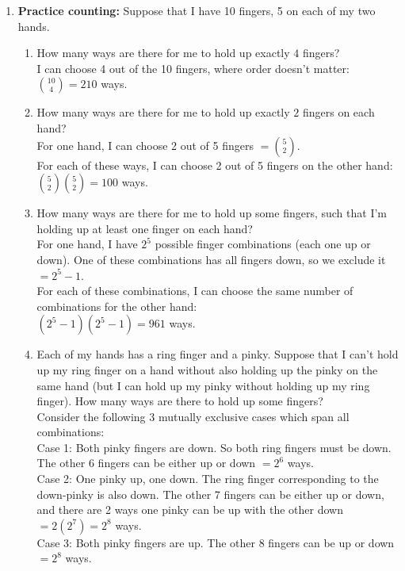 \documentclass[11pt,fleqn]{article}
\begin{document}
\begin{enumerate}

\item \textbf{Practice counting:}
Suppose that I have 10 fingers, 5 on each of my two hands.

\begin{enumerate}
\item How many ways are there for me to hold up exactly $4$ fingers? \\
I can choose 4 out of the 10 fingers, where order doesn't matter: \\
$\binom{10}{4} = 210$ ways.
\item How many ways are there for me to hold up exactly $2$ fingers
on each hand? \\
For one hand, I can choose 2 out of 5 fingers $=\binom{5}{2}$. \\
For each of these ways, I can choose 2 out of 5 fingers on the other hand: \\
$\binom{5}{2} \binom{5}{2} = 100$ ways.
\item How many ways are there for me to hold up some fingers,
such that I'm holding up at least one finger on each hand? \\
For one hand, I have $2^5$ possible finger combinations (each one up or down). One of these combinations has all fingers down, so we exclude it $=2^5 - 1$. \\
For each of these combinations, I can choose the same number of combinations for the other hand: \\
$(2^5-1)(2^5-1) = 961$ ways.
\item Each of my hands
has a ring finger and a pinky.
Suppose that I can't hold up my ring finger on a hand
without also holding up the pinky on the same hand
(but I can hold up my pinky without holding up my ring finger).
How many ways are there to hold up some fingers? \\
Consider the following 3 mutually exclusive cases which span all combinations: \\
Case 1: Both pinky fingers are down. So both ring fingers must be down. The other 6 fingers can be either up or down $=2^6$ ways. \\
Case 2: One pinky up, one down. The ring finger corresponding to the down-pinky is also down. The other 7 fingers can be either up or down, and there are 2 ways one pinky can be up with the other down $=2(2^7)=2^8$ ways. \\
Case 3: Both pinky fingers are up. The other 8 fingers can be up or down $=2^8$ ways. \\

\end{enumerate}
\end{enumerate}
\end{document}
